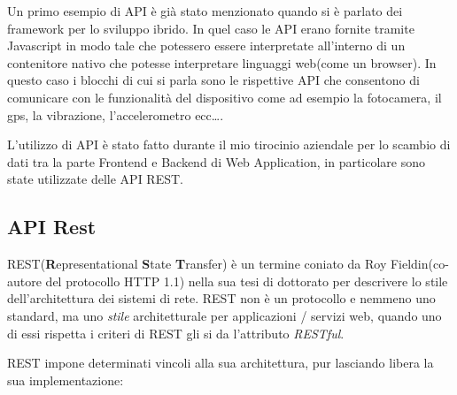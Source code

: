 Un primo esempio di API è già stato menzionato quando si è parlato dei framework per lo sviluppo ibrido. In quel caso le API erano fornite tramite Javascript in modo tale che potessero essere interpretate all'interno di un contenitore nativo che potesse interpretare linguaggi web(come un browser). In questo caso i blocchi di cui si parla sono le rispettive API che consentono di comunicare con le funzionalità del dispositivo come ad esempio la fotocamera, il gps, la vibrazione, l'accelerometro ecc\ldots.

L'utilizzo di API è stato fatto durante il mio tirocinio aziendale per lo scambio di dati tra la parte Frontend e Backend di Web Application, in particolare sono state utilizzate delle API REST.

\subsection{API Rest}

REST(\textbf{R}epresentational \textbf{S}tate \textbf{T}ransfer) è un termine coniato da Roy Fieldin(co-autore del protocollo HTTP 1.1) nella sua tesi di dottorato per descrivere lo stile dell'architettura dei sistemi di rete. REST non è un protocollo e nemmeno uno standard, ma uno \emph{stile} architetturale per applicazioni / servizi web, quando uno di essi rispetta i criteri di REST gli si da l'attributo \emph{RESTful}.

REST impone determinati vincoli alla sua architettura, pur lasciando libera la sua implementazione:

